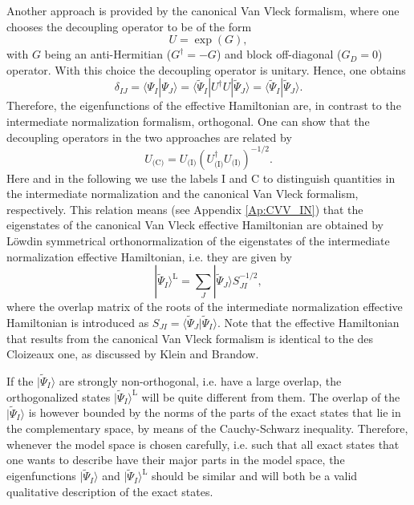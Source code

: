 Another approach is provided by the canonical Van Vleck formalism,\cite{ShaviR_1980_5711, Klein_1974_786} where one chooses the decoupling operator to be of the form
	\begin{equation}
	U = \exp (G),
	\end{equation} 	
with $G$ being an anti-Hermitian (${G^\dag } =  - G$) and block off-diagonal (${G_D} = 0$) operator. With this choice the decoupling operator is unitary. Hence, one obtains 
	\begin{equation}
	{\delta _{IJ}} = \langle {\Psi _I}|{\Psi _J}\rangle  = \langle {\tilde \Psi _I}|{U^\dag }U|{\tilde \Psi _J}\rangle  = \langle {\tilde \Psi _I}|{\tilde \Psi _J}\rangle. 
	\end{equation} 	
Therefore, the eigenfunctions of the effective Hamiltonian are, in contrast to the intermediate normalization formalism, orthogonal. One can show\cite{ShaviR_1980_5711} that the decoupling operators in the two approaches are related by
	\begin{equation}
	\label{Eq:relation_CVV_IN}
	{U_{{\text{(C)}}}} = {U_{{\text{(I)}}}}{(U_{{\text{(I)}}}^\dag {U_{{\text{(I)}}}})^{ - 1/2}}.
	\end{equation} 	
Here and in the following we use the labels I and C to distinguish quantities in the intermediate normalization and the canonical Van Vleck formalism, respectively. This relation means (see Appendix \ref{Ap:CVV_IN}) that the eigenstates of the canonical Van Vleck effective Hamiltonian are obtained by Löwdin symmetrical orthonormalization of the eigenstates of the intermediate normalization effective Hamiltonian, i.e. they are given by
	\begin{equation}
	\label{Eq:CVV_eigenstates}
	|\tilde \Psi _I\rangle^\text{L}  = \sum\limits_J | \tilde \Psi _J\rangle S_{JI}^{ - 1/2},
	\end{equation} 	
where the overlap matrix of the roots of the intermediate normalization effective Hamiltonian is introduced as ${S_{JI}} = \langle \tilde \Psi _J|\tilde \Psi _I\rangle $.
Note that the effective Hamiltonian that results from the canonical Van Vleck formalism is identical to the des Cloizeaux\cite{Cloiz_1960_321} one, as discussed by Klein\cite{Klein_1974_786} and Brandow.\cite{Brand_1975_1, Brand_1979_207}

If the $|\tilde{\Psi}_I\rangle$ are strongly non-orthogonal, i.e. have a large overlap, the orthogonalized states $|\tilde{\Psi}_I\rangle^\text{L}$ will be quite different from them. The overlap of the $|\tilde{\Psi}_I\rangle$ is however bounded by the norms of the parts of the exact states that lie in the complementary space, by means of the Cauchy-Schwarz inequality. Therefore, whenever the model space is chosen carefully, i.e. such that all exact states that one wants to describe have their major parts in the model space, the eigenfunctions $|\tilde{\Psi}_I\rangle$ and $|\tilde{\Psi}_I\rangle^\text{L}$ should be similar and will both be a valid qualitative description of the exact states.

